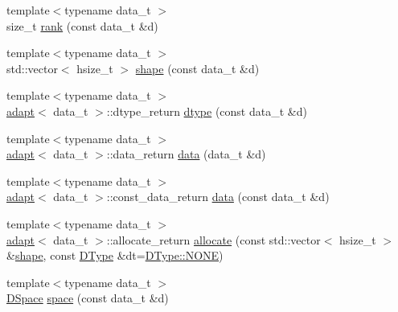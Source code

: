 \begin{DoxyCompactItemize}
\item 
{\footnotesize template$<$typename data\-\_\-t $>$ }\\size\-\_\-t \hyperlink{namespace_h5_t_l_a2bb6834f5cfb632c59f6b8833fb062e1}{rank} (const data\-\_\-t \&d)
\item 
{\footnotesize template$<$typename data\-\_\-t $>$ }\\std\-::vector$<$ hsize\-\_\-t $>$ \hyperlink{namespace_h5_t_l_a18d3869e336e2b6a64ec318cf9890c90}{shape} (const data\-\_\-t \&d)
\item 
{\footnotesize template$<$typename data\-\_\-t $>$ }\\\hyperlink{struct_h5_t_l_1_1adapt}{adapt}$<$ data\-\_\-t $>$\-::dtype\-\_\-return \hyperlink{namespace_h5_t_l_a85542c4df7874da8c91127958faa22a4}{dtype} (const data\-\_\-t \&d)
\item 
{\footnotesize template$<$typename data\-\_\-t $>$ }\\\hyperlink{struct_h5_t_l_1_1adapt}{adapt}$<$ data\-\_\-t $>$\-::data\-\_\-return \hyperlink{namespace_h5_t_l_a1d69ddff4138c6eae990acc82730d434}{data} (data\-\_\-t \&d)
\item 
{\footnotesize template$<$typename data\-\_\-t $>$ }\\\hyperlink{struct_h5_t_l_1_1adapt}{adapt}$<$ data\-\_\-t $>$\-::const\-\_\-data\-\_\-return \hyperlink{namespace_h5_t_l_a195c328d15cb83d2cfede33d7a7a5b35}{data} (const data\-\_\-t \&d)
\item 
{\footnotesize template$<$typename data\-\_\-t $>$ }\\\hyperlink{struct_h5_t_l_1_1adapt}{adapt}$<$ data\-\_\-t $>$\-::allocate\-\_\-return \hyperlink{namespace_h5_t_l_af374af4623acf05fb53284ae67ffc911}{allocate} (const std\-::vector$<$ hsize\-\_\-t $>$ \&\hyperlink{namespace_h5_t_l_a18d3869e336e2b6a64ec318cf9890c90}{shape}, const \hyperlink{class_h5_t_l_1_1_d_type}{D\-Type} \&dt=\hyperlink{class_h5_t_l_1_1_d_type_a6a438fe2e5e351a7a5f25deb4637f908}{D\-Type\-::\-N\-O\-N\-E})
\item 
{\footnotesize template$<$typename data\-\_\-t $>$ }\\\hyperlink{class_h5_t_l_1_1_d_space}{D\-Space} \hyperlink{namespace_h5_t_l_ae09d3a5b75f86dad261e807592fee081}{space} (const data\-\_\-t \&d)
\end{DoxyCompactItemize}


